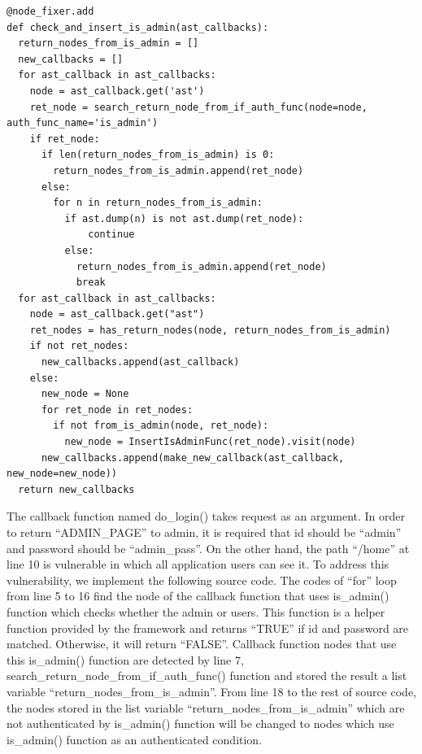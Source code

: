 \documentclass[conference]{IEEEtran}
\begin{document}
\begin{lstlisting}[caption={A vulnerable function which address an authentication leak.}, label=code:decorator, captionpos=b]
@node_fixer.add
def check_and_insert_is_admin(ast_callbacks):
  return_nodes_from_is_admin = []
  new_callbacks = []
  for ast_callback in ast_callbacks:
    node = ast_callback.get('ast')
    ret_node = search_return_node_from_if_auth_func(node=node, auth_func_name='is_admin')
    if ret_node:
      if len(return_nodes_from_is_admin) is 0:
        return_nodes_from_is_admin.append(ret_node)
      else:
        for n in return_nodes_from_is_admin:
          if ast.dump(n) is not ast.dump(ret_node):
              continue
          else:
            return_nodes_from_is_admin.append(ret_node)
            break
  for ast_callback in ast_callbacks:
    node = ast_callback.get("ast")
    ret_nodes = has_return_nodes(node, return_nodes_from_is_admin)
    if not ret_nodes:
      new_callbacks.append(ast_callback)
    else:
      new_node = None
      for ret_node in ret_nodes:
        if not from_is_admin(node, ret_node):
          new_node = InsertIsAdminFunc(ret_node).visit(node)
      new_callbacks.append(make_new_callback(ast_callback, new_node=new_node))
  return new_callbacks
\end{lstlisting}
The callback function named do\_login() takes request as an argument. In order to return “ADMIN\_PAGE” to admin, it is required that id should be “admin” and password should be “admin\_pass”.
On the other hand, the path “/home” at line 10 is vulnerable in which all application users can see it. To address this vulnerability, we implement the following source code.
The codes of “for” loop from line 5 to 16 find the node of the callback function that uses is\_admin() function which checks whether the admin or users. This function is a helper function provided by the framework and returns “TRUE” if id and password are matched. Otherwise, it will return “FALSE”.
Callback function nodes that use this is\_admin() function are detected by line 7, search\_return\_node\_from\_if\_auth\_func() function and stored the result a list variable “return\_nodes\_from\_is\_admin”.
From line 18 to the rest of source code, the nodes stored in the list variable “return\_nodes\_from\_is\_admin” which are not authenticated by is\_admin() function will be changed to nodes which use is\_admin() function as an authenticated condition.
\end{document}
